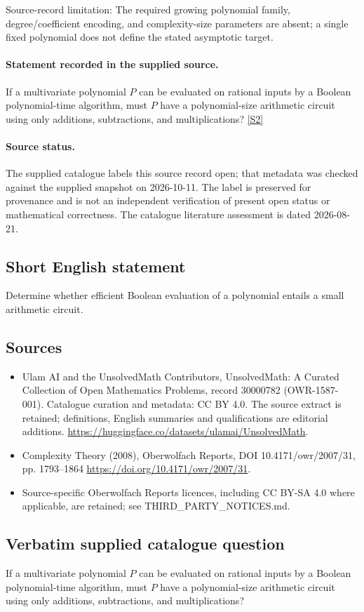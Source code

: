 \documentclass[11pt]{article}
\begin{document}
Source-record limitation: The required growing polynomial family, degree/coefficient encoding, and complexity-size parameters are absent; a single fixed polynomial does not define the stated asymptotic target.
\paragraph{Statement recorded in the supplied source.}
If a multivariate polynomial $P$ can be evaluated on rational inputs by a Boolean polynomial-time algorithm, must $P$ have a polynomial-size arithmetic circuit using only additions, subtractions, and multiplications? \href{https://doi.org/10.4171/owr/2007/31}{[S2]}
\paragraph{Source status.}
The supplied catalogue labels this source record open; that metadata was checked against the supplied snapshot on 2026-10-11. The label is preserved for provenance and is not an independent verification of present open status or mathematical correctness. The catalogue literature assessment is dated 2026-08-21.
\subsection{Short English statement}
Determine whether efficient Boolean evaluation of a polynomial entails a small arithmetic circuit.
\subsection{Sources}
\begin{itemize}
\item[S1] Ulam AI and the UnsolvedMath Contributors, UnsolvedMath: A Curated Collection of Open Mathematics Problems, record 30000782 (OWR-1587-001). Catalogue curation and metadata: CC BY 4.0. The source extract is retained; definitions, English summaries and qualifications are editorial additions.
\url{https://huggingface.co/datasets/ulamai/UnsolvedMath}.
\item[S2] Complexity Theory (2008), Oberwolfach Reports, DOI 10.4171/owr/2007/31, pp. 1793--1864
\url{https://doi.org/10.4171/owr/2007/31}.
\item Source-specific Oberwolfach Reports licences, including CC BY-SA 4.0 where applicable, are retained; see THIRD\_PARTY\_NOTICES.md.
\end{itemize}
\subsection{Verbatim supplied catalogue question}
If a multivariate polynomial $P$ can be evaluated on rational inputs by a Boolean polynomial-time algorithm, must $P$ have a polynomial-size arithmetic circuit using only additions, subtractions, and multiplications?
\end{document}
